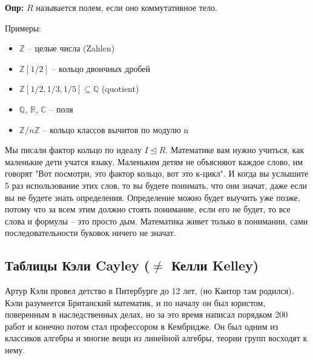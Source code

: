 \textbf{Опр:} $R$ называется полем, если оно коммутативное тело.

Примеры:
\begin{itemize}
    \item $\mathbb{Z}$ – целые числа (Zahlen)
    \item $\mathbb{Z}[1/2]$ – кольцо двоичных дробей
    \item $\mathbb{Z}[1/2, 1/3, 1/5]\subseteq\mathbb{Q}$ (quotient)
    \item $\mathbb{Q}$, $\mathbb{R}$, $\mathbb{C}$ – поля
    \item $\mathbb{Z}/n\mathbb{Z}$ – кольцо классов вычитов по модулю n
\end{itemize}

Мы писали фактор кольцо по идеалу $I\unlhd R$. Математике вам нужно учиться,
как маленькие дети учатся языку. Маленьким детям не объясняют каждое слово, им
говорят "Вот посмотри, это фактор кольцо, вот это к-цикл". И когда вы услышите
5 раз использование этих слов, то вы будете понимать, что они значат, даже если
вы не будете знать определения. Определение можно будет выучить уже позже,
потому что за всем этим должно стоять понимание, если его не будет, то все
слова и формулы – это просто дым. Математика живет только в понимании, сами
последовательности буковок ничего не значат.

\subsection{Таблицы Кэли Cayley ($\neq$ Келли Kelley)}
Артур Кэли провел детство в Питербурге до 12 лет, (но Кантор там родился). Кэли
разумеется Британский математик, и по началу он был юристом, поверенным в
наследственных делах, но за это время написал порядком 200 работ и конечно
потом стал профессором в Кембридже. Он был одним из классиков алгебры и многие
вещи из линейной алгебры, теории групп восходят к нему.

